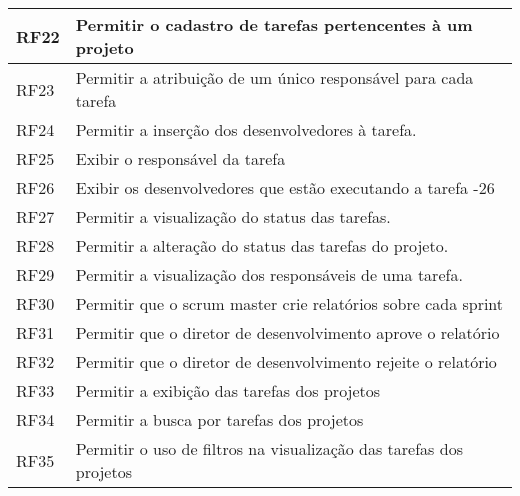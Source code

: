 \begin{table}[H]
\begin{tabular}{|l|l|}
RF22 & Permitir o cadastro de tarefas pertencentes à um projeto                                                                                              \\ \hline
RF23 & Permitir a atribuição de um único responsável para cada tarefa                                                                                        \\ \hline
RF24 & Permitir a inserção dos desenvolvedores à tarefa.                                                                                                     \\ \hline
RF25 & Exibir o responsável da tarefa                                                                                                                        \\ \hline
RF26 & Exibir os desenvolvedores que estão executando a tarefa -26                                                                                           \\ \hline
RF27 & Permitir a visualização do status das tarefas.                                                                                                        \\ \hline
RF28 & Permitir a alteração do status das tarefas do projeto.                                                                                                \\ \hline
RF29 & Permitir a visualização dos responsáveis de uma tarefa.                                                                                               \\ \hline
RF30 & Permitir que o scrum master crie relatórios sobre cada sprint                                                                                         \\ \hline
RF31 & Permitir que o diretor de desenvolvimento aprove o relatório                                                                                          \\ \hline
RF32 & Permitir que o diretor de desenvolvimento rejeite o relatório                                                                                         \\ \hline
RF33 & Permitir a exibição das tarefas dos projetos                                                                                                          \\ \hline
RF34 & Permitir a busca por tarefas dos projetos                                                                                                             \\ \hline
RF35 & Permitir o uso de filtros na visualização das tarefas dos projetos                                                                                    \\ \hline
\end{tabular}
\end{table}

